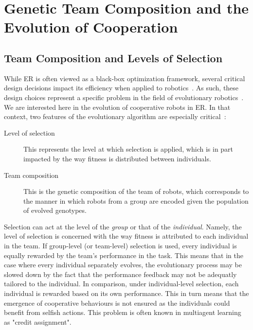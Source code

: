 

\section{Genetic Team Composition and the Evolution of Cooperation}

  \subsection{Team Composition and Levels of Selection}

    While ER is often viewed as a black-box optimization framework, several critical design decisions impact its efficiency when applied to robotics~\parencite{Trianni2014b}. As such, these design choices represent a specific problem in the field of evolutionary robotics~\parencite{Doncieux2014a}. We are interested here in the evolution of cooperative robots in ER. In that context, two features of the evolutionary algorithm are especially critical~\parencite{Waibel2009, Lichocki2013}:

    \begin{description}
      \item[Level of selection] {This represents the level at which selection is applied, which is in part impacted by the way fitness is distributed between individuals.}

      \item[Team composition] {This is the genetic composition of the team of robots, which corresponds to the manner in which robots from a group are encoded given the population of evolved genotypes.}
    \end{description}

    Selection can act at the level of the \emph{group} or that of the \emph{individual}. Namely, the level of selection is concerned with the way fitness is attributed to each individual in the team. If group-level (or team-level) selection is used, every individual is equally rewarded by the team's performance in the task. This means that in the case where every individual separately evolves, the evolutionary process may be slowed down by the fact that the performance feedback may not be adequatly tailored to the individual. In comparison, under individual-level selection, each individual is rewarded based on its own performance. This in turn means that the emergence of cooperative behaviours is not ensured as the individuals could benefit from selfish actions. This problem is often known in multiagent learning as "credit assignment".

